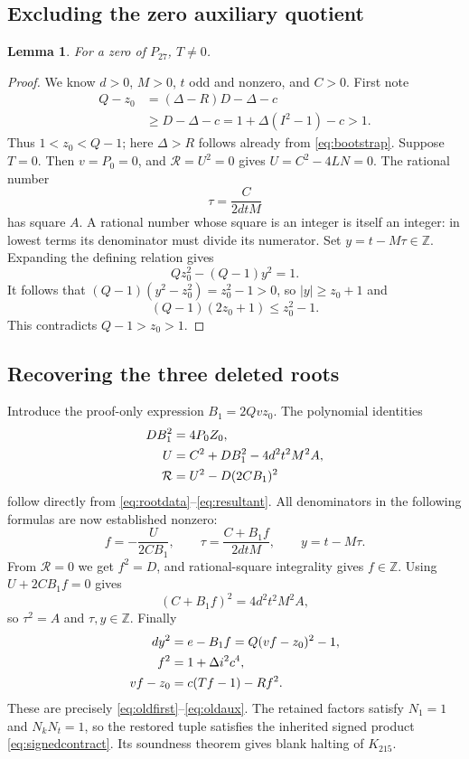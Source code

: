 \documentclass[11pt]{article}
\newtheorem{lemma}[theorem]{Lemma}
\theoremstyle{definition}\newtheorem{definition}[theorem]{Definition}
\theoremstyle{remark}\newtheorem{remark}[theorem]{Remark}
\newcommand{\Z}{\mathbb Z}\newcommand{\N}{\mathbb N}
\newcommand{\Res}{\mathcal R}\newcommand{\pc}{\operatorname{pc}}
\begin{document}
\subsection{Excluding the zero auxiliary quotient}
\begin{lemma}
\label{lem:nonzeroT}
For a zero of $P_{27}$, $T\ne0$.
\end{lemma}
\begin{proof}
We know $d>0$, $M>0$, $t$ odd and nonzero, and $C>0$. First note
\begin{align*}
Q-z_0&=(\Delta-R)D-\Delta-c\\
&\ge D-\Delta-c
 =1+\Delta(I^2-1)-c>1.
\end{align*}
Thus $1<z_0<Q-1$; here $\Delta>R$ follows already from \eqref{eq:bootstrap}. Suppose $T=0$. Then $v=P_0=0$, and $\Res=U^2=0$ gives $U=C^2-4LN=0$. The rational number
\[
\tau=\frac{C}{2dtM}
\]
has square $A$. A rational number whose square is an integer is itself an integer: in lowest terms its denominator must divide its numerator. Set $y=t-M\tau\in\Z$. Expanding the defining relation gives
\[
Qz_0^2-(Q-1)y^2=1.
\]
It follows that $(Q-1)(y^2-z_0^2)=z_0^2-1>0$, so $|y|\ge z_0+1$ and
\[
(Q-1)(2z_0+1)\le z_0^2-1.
\]
This contradicts $Q-1>z_0>1$.
\end{proof}

\subsection{Recovering the three deleted roots}
Introduce the proof-only expression $B_1=2Qvz_0$. The polynomial identities
\begin{align}
DB_1^2&=4P_0Z_0,\notag\\
U&=C^2+DB_1^2-4d^2t^2M^2A,\notag\\
\Res&=U^2-D(2CB_1)^2\label{eq:rootidentity}
\end{align}
follow directly from \eqref{eq:rootdata}--\eqref{eq:resultant}.
All denominators in the following formulas are now established nonzero:
\begin{equation}
f=-\frac{U}{2CB_1},\qquad
\tau=\frac{C+B_1f}{2dtM},\qquad
y=t-M\tau.\label{eq:inverse}
\end{equation}
From $\Res=0$ we get $f^2=D$, and rational-square integrality gives $f\in\Z$. Using $U+2CB_1f=0$ gives
\[
(C+B_1f)^2=4d^2t^2M^2A,
\]
so $\tau^2=A$ and $\tau,y\in\Z$. Finally
\begin{align}
dy^2&=e-B_1f=Q(vf-z_0)^2-1,\notag\\
f^2&=1+\Delta i^2c^4,\notag\\
vf-z_0&=c(Tf-1)-Rf^2.\label{eq:restored}
\end{align}
These are precisely \eqref{eq:oldfirst}--\eqref{eq:oldaux}. The retained factors satisfy $N_1=1$ and $N_kN_t=1$, so the restored tuple satisfies the inherited signed product \eqref{eq:signedcontract}. Its soundness theorem gives blank halting of $K_{215}$.
\end{document}

